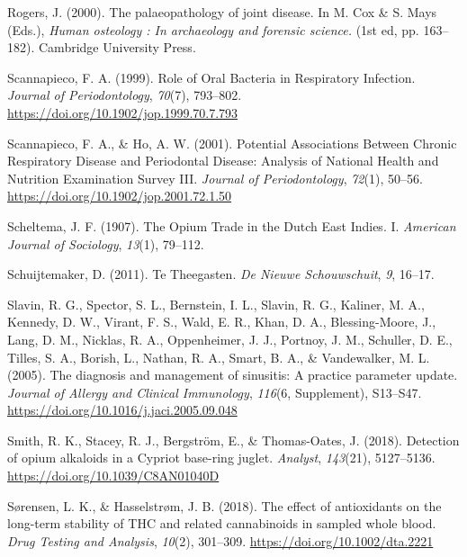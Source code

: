 \documentclass[
  b5paper,
]{book}
\newlength{\cslhangindent}
\newlength{\cslentryspacingunit} %
\newenvironment{CSLReferences}[2] %
 {%
  \setlength{\parindent}{0pt}
  \ifodd #1
  \let\oldpar\par
  \def\par{\hangindent=\cslhangindent\oldpar}
  \fi
  \setlength{\parskip}{#2\cslentryspacingunit}
 }%
 {}
\begin{document}
\begin{CSLReferences}{1}{0}
\leavevmode{}%
Rogers, J. (2000). The palaeopathology of joint disease. In M. Cox \& S.
Mays (Eds.), \emph{Human osteology : {In} archaeology and forensic
science.} (1st ed, pp. 163--182). {Cambridge University Press}.

\leavevmode{}%
Scannapieco, F. A. (1999). Role of {Oral Bacteria} in {Respiratory
Infection}. \emph{Journal of Periodontology}, \emph{70}(7), 793--802.
\url{https://doi.org/10.1902/jop.1999.70.7.793}

\leavevmode{}%
Scannapieco, F. A., \& Ho, A. W. (2001). Potential {Associations Between
Chronic Respiratory Disease} and {Periodontal Disease}: {Analysis} of
{National Health} and {Nutrition Examination Survey III}. \emph{Journal
of Periodontology}, \emph{72}(1), 50--56.
\url{https://doi.org/10.1902/jop.2001.72.1.50}

\leavevmode{}%
Scheltema, J. F. (1907). The {Opium Trade} in the {Dutch East Indies}.
{I}. \emph{American Journal of Sociology}, \emph{13}(1), 79--112.

\leavevmode{}%
Schuijtemaker, D. (2011). {Te Theegasten}. \emph{De Nieuwe
Schouwschuit}, \emph{9}, 16--17.

\leavevmode{}%
Slavin, R. G., Spector, S. L., Bernstein, I. L., Slavin, R. G., Kaliner,
M. A., Kennedy, D. W., Virant, F. S., Wald, E. R., Khan, D. A.,
Blessing-Moore, J., Lang, D. M., Nicklas, R. A., Oppenheimer, J. J.,
Portnoy, J. M., Schuller, D. E., Tilles, S. A., Borish, L., Nathan, R.
A., Smart, B. A., \& Vandewalker, M. L. (2005). The diagnosis and
management of sinusitis: {A} practice parameter update. \emph{Journal of
Allergy and Clinical Immunology}, \emph{116}(6, Supplement), S13--S47.
\url{https://doi.org/10.1016/j.jaci.2005.09.048}

\leavevmode{}%
Smith, R. K., Stacey, R. J., Bergström, E., \& Thomas-Oates, J. (2018).
Detection of opium alkaloids in a {Cypriot} base-ring juglet.
\emph{Analyst}, \emph{143}(21), 5127--5136.
\url{https://doi.org/10.1039/C8AN01040D}

\leavevmode{}%
Sørensen, L. K., \& Hasselstrøm, J. B. (2018). The effect of
antioxidants on the long-term stability of {THC} and related
cannabinoids in sampled whole blood. \emph{Drug Testing and Analysis},
\emph{10}(2), 301--309. \url{https://doi.org/10.1002/dta.2221}


\end{CSLReferences}
\end{document}
